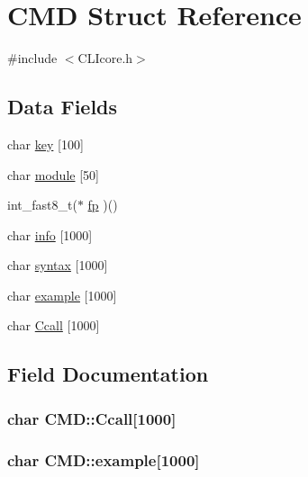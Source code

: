 \hypertarget{structCMD}{}\section{C\+M\+D Struct Reference}
\label{structCMD}


{\ttfamily \#include $<$C\+L\+Icore.\+h$>$}

\subsection*{Data Fields}
\begin{DoxyCompactItemize}
\item 
char \hyperlink{structCMD_ab3aedae0ea688867922c5db16e0c136f}{key} \mbox{[}100\mbox{]}
\item 
char \hyperlink{structCMD_a4cdcd2100bc392217fc7b794e20a261a}{module} \mbox{[}50\mbox{]}
\item 
int\+\_\+fast8\+\_\+t($\ast$ \hyperlink{structCMD_ae8ee9d3a38444931eae3f8988af15acb}{fp} )()
\item 
char \hyperlink{structCMD_a008f20bb66a74f15dc4e9536ca19dd9a}{info} \mbox{[}1000\mbox{]}
\item 
char \hyperlink{structCMD_af841a2189f9e693dd3ec530d368d3e92}{syntax} \mbox{[}1000\mbox{]}
\item 
char \hyperlink{structCMD_ace2e43b45ffe9d3be7e053c864b2807e}{example} \mbox{[}1000\mbox{]}
\item 
char \hyperlink{structCMD_a4444ae77b67843964c412bb7f283c373}{Ccall} \mbox{[}1000\mbox{]}
\end{DoxyCompactItemize}


\subsection{Field Documentation}
\hypertarget{structCMD_a4444ae77b67843964c412bb7f283c373}{}
\subsubsection[{Ccall}]{\setlength{\rightskip}{0pt plus 5cm}char C\+M\+D\+::\+Ccall\mbox{[}1000\mbox{]}}\label{structCMD_a4444ae77b67843964c412bb7f283c373}
\hypertarget{structCMD_ace2e43b45ffe9d3be7e053c864b2807e}{}
\subsubsection[{example}]{\setlength{\rightskip}{0pt plus 5cm}char C\+M\+D\+::example\mbox{[}1000\mbox{]}}\label{structCMD_ace2e43b45ffe9d3be7e053c864b2807e}
\hypertarget{structCMD_ae8ee9d3a38444931eae3f8988af15acb}{}
